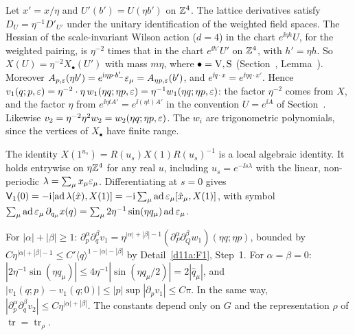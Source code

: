 \begin{detail}\label{d11a:F11}
\begin{step}[Scaling]
Let $x'=x/\eta$ and $U'(b')=U(\eta b')$ on $\mathbb Z^4$. The lattice derivatives satisfy $D_U=\eta^{-1}D'_{U'}$ under the unitary identification of the weighted field spaces. The Hessian of the scale-invariant Wilson action ($d=4$) in the chart $e^{\ii\eta h}U$, for the weighted pairing, is $\eta^{-2}$ times that in the chart $e^{\ii h'}U'$ on $\mathbb Z^4$, with $h'=\eta h$. So $X(U)=\eta^{-2}X_\bullet(U')$ with mass $m\eta$, where $\bullet={\rm V},{\rm S}$ (Section~, Lemma~). Moreover $A_{p,\varepsilon}(\eta b')=e^{\mathrm i\eta p\cdot b'_-}\varepsilon_\mu=A_{\eta p,\varepsilon}(b')$, and $e^{\ii q\cdot x}=e^{\ii\eta q\cdot x'}$. Hence $v_1(q;p,\varepsilon)=\eta^{-2}\cdot\eta\,w_1(\eta q;\eta p,\varepsilon)=\eta^{-1}w_1(\eta q;\eta p,\varepsilon)$: the factor $\eta^{-2}$ comes from $X$, and the factor $\eta$ from $e^{\ii\eta tA'}=e^{\ii(\eta t)A'}$ in the convention $U=e^{\ii A}$ of Section~. Likewise $v_2=\eta^{-2}\eta^2w_2=w_2(\eta q;\eta p,\varepsilon)$. The $w_i$ are trigonometric polynomials, since the vertices of $X_\bullet$ have finite range.
\end{step}
\begin{step}[(a)]
The identity $X(1^{u_s})=R(u_s)X(1)R(u_s)^{-1}$ is a local algebraic identity. It holds entrywise on $\eta\mathbb Z^4$ for any real $u$, including $u_s=e^{-\ii s\lambda}$ with the linear, non-periodic $\lambda=\sum_\mu x_\mu\varepsilon_\mu$. Differentiating at $s=0$ gives $\mathsf V_1(0)=-\mathrm i[\operatorname{ad}\lambda(\hat x),X(1)]=-\mathrm i\sum_\mu\operatorname{ad}\varepsilon_\mu[\hat x_\mu,X(1)]$, with symbol $\sum_\mu\operatorname{ad}\varepsilon_\mu\,\partial_{q_\mu}x(q)=\sum_\mu2\eta^{-1}\sin(\eta q_\mu)\operatorname{ad}\varepsilon_\mu$.
\end{step}
\begin{step}[(b)]
For $|\alpha|+|\beta|\ge1$: $\partial_p^\alpha\partial_q^\beta v_1=\eta^{|\alpha|+|\beta|-1}(\partial^\alpha_P\partial^\beta_Qw_1)(\eta q;\eta p)$, bounded by $C\eta^{|\alpha|+|\beta|-1}\le C'\langle q\rangle^{1-|\alpha|-|\beta|}$ by Detail~\ref{d11a:F1}, Step~1. For $\alpha=\beta=0$: $|2\eta^{-1}\sin(\eta q_\mu)|\le4\eta^{-1}|\sin(\eta q_\mu/2)|=2|\hat q_\mu|$, and $|v_1(q;p)-v_1(q;0)|\le|p|\sup|\partial_pv_1|\le C\pi$. In the same way, $|\partial^\alpha_p\partial^\beta_qv_2|\le C\eta^{|\alpha|+|\beta|}$. The constants depend only on $G$ and the representation $\rho$ of $\operatorname{tr}=\operatorname{tr}_\rho$.
\end{step}
\end{detail}

